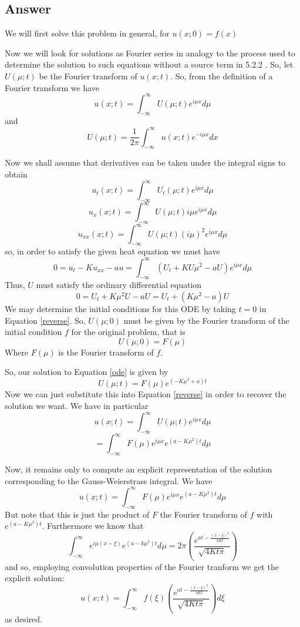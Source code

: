 \documentclass[12pt]{article}
\begin{document}
\subsection{Answer}

We will first solve this problem in general, for $ u(x;0)=f(x)$

Now we will look for solutions as Fourier series in analogy to the process used to determine the solution to such equations without a source term in 5.2.2 \cite[Page 295]{pinsky}. So, let $U(\mu;t)$ be the Fourier transform of $u(x;t)$. So, from the definition of a Fourier transform we have 
\begin{equation}\label{reverse}u(x;t)=\int_{-\infty}^\infty U(\mu;t) e^{i \mu x}d\mu\end{equation}
and
\begin{equation}\label{forwards}U(\mu;t)=\frac{1}{2\pi}\int_{-\infty}^\infty u(x;t) e^{-i \mu x}dx\end{equation}

Now we shall assume that derivatives can be taken under the integral signs to obtain 
\[u_t(x;t)=\int_{-\infty}^\infty U_t(\mu;t) e^{i \mu x} d\mu\]
\[u_x(x;t)=\int_{-\infty}^\infty U(\mu;t) i \mu e^{i \mu x} d\mu\]
\[u_{xx}(x;t)=\int_{-\infty}^\infty U(\mu;t) (i\mu)^2 e^{i \mu x} d\mu\]
so, in order to satisfy the given heat equation we must have
\[0=u_t-Ku_{xx}-au=\int_{-\infty}^\infty \left( U_t + K U\mu^2 -aU \right) e^{i \mu x} d\mu\]
Thus, $U$ must satisfy the ordinary differential equation 
\begin{equation}\label{ode}0=U_t+K\mu^2U-aU=U_t+(K\mu^2-a)U\end{equation}
We may determine the initial conditions for this ODE by taking $t=0$ in Equation \ref{reverse}. So, $U(\mu;0)$ must be given by the Fourier transform of the initial condition $f$ for the original problem, that is
\[U(\mu;0)=F(\mu)\]
Where $F(\mu)$ is the Fourier transform of $f$.

So, our solution to Equation \ref{ode} is given by 
\[U(\mu;t)=F(\mu)e^{(-K\mu^2+a)t}\]
Now we can just substitute this into Equation \ref{reverse} in order to recover the solution we want. We have in particular
\[u(x;t)=\int_{-\infty}^\infty U(\mu;t)e^{i \mu x} d\mu \]
\[=\int_{-\infty}^\infty F(\mu) e^{i\mu x}e^{(a-K \mu^2)t}d\mu \]

Now, it remains only to compute an explicit representation of the solution corresponding to the Gauss-Weierstrass integral. We have 
\[u(x;t)=\int_{-\infty}^\infty F(\mu) e^{i\mu x}e^{(a-K \mu^2)t}d\mu \]
But note that this is just the product of $F$ the Fourier transform of $f$ with $e^{(a-K\mu^2)t}$. Furthermore we know that
\[\int_{-\infty}^\infty e^{i\mu(x-\xi)}e^{(a-k\mu^2)t}d\mu=2\pi \left( \frac{e^{at-\frac{(x-\xi)^2}{4Kt}}}{\sqrt{4 K t \pi}} \right) \]
and so, employing convolution properties of the Fourier tranform \cite[Theorem 5.2]{pinsky} we get the explicit solution:
\[u(x;t)=\int_{-\infty}^\infty f(\xi) \left( \frac{e^{at-\frac{(x-\xi)^2}{4Kt}}}{\sqrt{4 K t \pi}} \right) d \xi \]
as desired.
\end{document}
